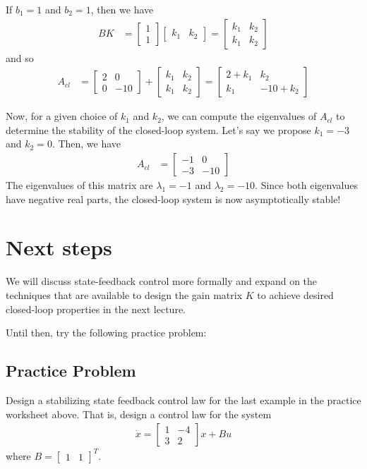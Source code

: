 \documentclass{ee122_notes}
\begin{document}
If $b_1 = 1$ and $b_2 = 1$, then we have
\begin{align*}
BK
&=
\begin{bmatrix}
1 \\ 1
\end{bmatrix}
\begin{bmatrix}
k_1 & k_2
\end{bmatrix}
=
\begin{bmatrix}
k_1 & k_2\\
k_1 & k_2
\end{bmatrix}
\end{align*}
and so
\begin{align*}
A_{cl}
&=
\begin{bmatrix}
2 & 0\\
0 & -10
\end{bmatrix}
+
\begin{bmatrix}
k_1 & k_2\\
k_1 & k_2
\end{bmatrix}
=
\begin{bmatrix}
2 + k_1 & k_2\\
k_1 & -10 + k_2
\end{bmatrix}
\end{align*}

Now, for a given choice of $k_1$ and $k_2$, we can compute the eigenvalues of $A_{cl}$ to determine the stability of the closed-loop system. Let's say we propose $k_1 = -3$ and $k_2 = 0$. Then, we have
\begin{align*}
A_{cl}
&=
\begin{bmatrix}
    -1 & 0\\
    -3 & -10
\end{bmatrix}
\end{align*}
The eigenvalues of this matrix are $\lambda_1 = -1$ and $\lambda_2 = -10$. Since both eigenvalues have negative real parts, the closed-loop system is now asymptotically stable!

\section{Next steps}
We will discuss state-feedback control more formally and expand on the techniques that are available to design the gain matrix $K$ to achieve desired closed-loop properties in the next lecture. 

Until then, try the following practice problem:
\subsection{Practice Problem}
Design a stabilizing state feedback control law for the last example in the practice worksheet above. That is, design a control law for the system
\begin{align*}
\dot{x} =
\begin{bmatrix}
1 & -4\\
3 & 2
\end{bmatrix}x + Bu
\end{align*}
where $B = \begin{bmatrix} 1 & 1 \end{bmatrix}^T$.
\end{document}
